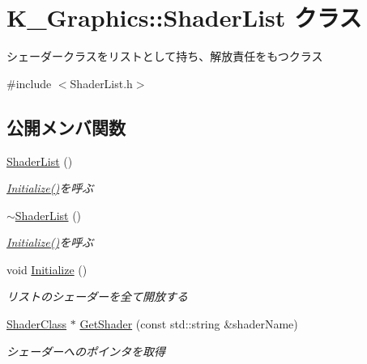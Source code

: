 \hypertarget{class_k___graphics_1_1_shader_list}{}\section{K\+\_\+\+Graphics\+:\+:Shader\+List クラス}
\label{class_k___graphics_1_1_shader_list}


シェーダークラスをリストとして持ち、解放責任をもつクラス  




{\ttfamily \#include $<$Shader\+List.\+h$>$}

\subsection*{公開メンバ関数}
\begin{DoxyCompactItemize}
\item 
\mbox{\hyperlink{class_k___graphics_1_1_shader_list_a93645f83598573fa2695489fcac10b6f}{Shader\+List}} ()
\begin{DoxyCompactList}\small\item\em \mbox{\hyperlink{class_k___graphics_1_1_shader_list_af5d3c07fdd3519e2c79792a462e26fc3}{Initialize()}}を呼ぶ \end{DoxyCompactList}\item 
\mbox{\hyperlink{class_k___graphics_1_1_shader_list_a77ff9ce6e8e54ca516fd5ac4281688f6}{$\sim$\+Shader\+List}} ()
\begin{DoxyCompactList}\small\item\em \mbox{\hyperlink{class_k___graphics_1_1_shader_list_af5d3c07fdd3519e2c79792a462e26fc3}{Initialize()}}を呼ぶ \end{DoxyCompactList}\item 
void \mbox{\hyperlink{class_k___graphics_1_1_shader_list_af5d3c07fdd3519e2c79792a462e26fc3}{Initialize}} ()
\begin{DoxyCompactList}\small\item\em リストのシェーダーを全て開放する \end{DoxyCompactList}\item 
\mbox{\hyperlink{class_k___graphics_1_1_shader_class}{Shader\+Class}} $\ast$ \mbox{\hyperlink{class_k___graphics_1_1_shader_list_a04083fe5c271e708da835e934cb57b6e}{Get\+Shader}} (const std\+::string \&shader\+Name)
\begin{DoxyCompactList}\small\item\em シェーダーへのポインタを取得 \end{DoxyCompactList}\item 

\end{DoxyCompactItemize}
